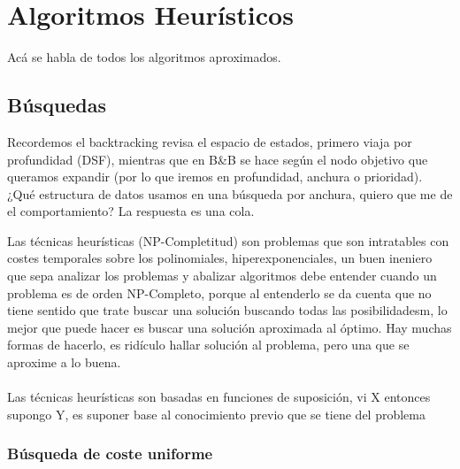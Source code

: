 \chapter{Algoritmos Heurísticos}
Acá se habla de todos los algoritmos aproximados.

\section{Búsquedas}
Recordemos el backtracking revisa el espacio de estados, primero viaja por profundidad (DSF), mientras que en B\&B se hace según el nodo objetivo que queramos expandir (por lo que iremos en profundidad, anchura o prioridad). ¿Qué estructura de datos usamos en una búsqueda por anchura, quiero que me de el comportamiento? La respuesta es una cola.

\begin{definition}[Heurísticas]
	Las técnicas heurísticas (NP-Completitud) son problemas que son intratables con costes temporales sobre los polinomiales, hiperexponenciales, un buen ineniero que sepa analizar los problemas y abalizar algoritmos debe entender cuando un problema es de orden NP-Completo, porque al entenderlo se da cuenta que no tiene sentido que trate buscar una solución buscando todas las posibilidadesm, lo mejor que puede hacer es buscar una solución aproximada al óptimo. Hay muchas formas de hacerlo, es ridículo hallar solución al problema, pero una que se aproxime a lo buena.
	\\~\\
	Las técnicas heurísticas son basadas en funciones de suposición, vi X entonces supongo Y, es suponer base al conocimiento previo que se tiene del problema
\end{definition}

\subsection{Búsqueda de coste uniforme}


